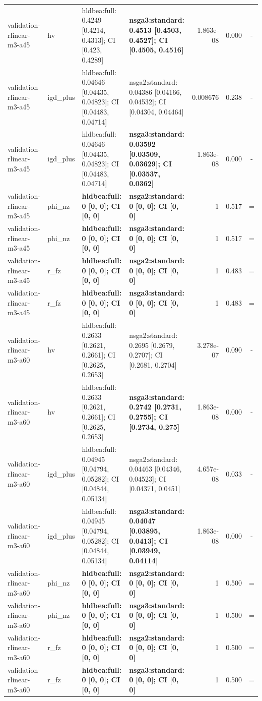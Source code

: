 \begin{tabular}{llllrrc}
validation-rlinear-m3-a45 & hv & hldbea:full: 0.4249 [0.4214, 0.4313]; CI [0.423, 0.4289] & \textbf{nsga3:standard: 0.4513 [0.4503, 0.4527]; CI [0.4505, 0.4516]} & 1.863e-08 & 0.000 & - \\
validation-rlinear-m3-a45 & igd\_plus & hldbea:full: 0.04646 [0.04435, 0.04823]; CI [0.04483, 0.04714] & nsga2:standard: 0.04386 [0.04166, 0.04532]; CI [0.04304, 0.04464] & 0.008676 & 0.238 & - \\
validation-rlinear-m3-a45 & igd\_plus & hldbea:full: 0.04646 [0.04435, 0.04823]; CI [0.04483, 0.04714] & \textbf{nsga3:standard: 0.03592 [0.03509, 0.03629]; CI [0.03537, 0.0362]} & 1.863e-08 & 0.000 & - \\
validation-rlinear-m3-a45 & phi\_nz & \textbf{hldbea:full: 0 [0, 0]; CI [0, 0]} & \textbf{nsga2:standard: 0 [0, 0]; CI [0, 0]} & 1 & 0.517 & = \\
validation-rlinear-m3-a45 & phi\_nz & \textbf{hldbea:full: 0 [0, 0]; CI [0, 0]} & \textbf{nsga3:standard: 0 [0, 0]; CI [0, 0]} & 1 & 0.517 & = \\
validation-rlinear-m3-a45 & r\_fz & \textbf{hldbea:full: 0 [0, 0]; CI [0, 0]} & \textbf{nsga2:standard: 0 [0, 0]; CI [0, 0]} & 1 & 0.483 & = \\
validation-rlinear-m3-a45 & r\_fz & \textbf{hldbea:full: 0 [0, 0]; CI [0, 0]} & \textbf{nsga3:standard: 0 [0, 0]; CI [0, 0]} & 1 & 0.483 & = \\
validation-rlinear-m3-a60 & hv & hldbea:full: 0.2633 [0.2621, 0.2661]; CI [0.2625, 0.2653] & nsga2:standard: 0.2695 [0.2679, 0.2707]; CI [0.2681, 0.2704] & 3.278e-07 & 0.090 & - \\
validation-rlinear-m3-a60 & hv & hldbea:full: 0.2633 [0.2621, 0.2661]; CI [0.2625, 0.2653] & \textbf{nsga3:standard: 0.2742 [0.2731, 0.2755]; CI [0.2734, 0.275]} & 1.863e-08 & 0.000 & - \\
validation-rlinear-m3-a60 & igd\_plus & hldbea:full: 0.04945 [0.04794, 0.05282]; CI [0.04844, 0.05134] & nsga2:standard: 0.04463 [0.04346, 0.04523]; CI [0.04371, 0.0451] & 4.657e-08 & 0.033 & - \\
validation-rlinear-m3-a60 & igd\_plus & hldbea:full: 0.04945 [0.04794, 0.05282]; CI [0.04844, 0.05134] & \textbf{nsga3:standard: 0.04047 [0.03895, 0.0413]; CI [0.03949, 0.04114]} & 1.863e-08 & 0.000 & - \\
validation-rlinear-m3-a60 & phi\_nz & \textbf{hldbea:full: 0 [0, 0]; CI [0, 0]} & \textbf{nsga2:standard: 0 [0, 0]; CI [0, 0]} & 1 & 0.500 & = \\
validation-rlinear-m3-a60 & phi\_nz & \textbf{hldbea:full: 0 [0, 0]; CI [0, 0]} & \textbf{nsga3:standard: 0 [0, 0]; CI [0, 0]} & 1 & 0.500 & = \\
validation-rlinear-m3-a60 & r\_fz & \textbf{hldbea:full: 0 [0, 0]; CI [0, 0]} & \textbf{nsga2:standard: 0 [0, 0]; CI [0, 0]} & 1 & 0.500 & = \\
validation-rlinear-m3-a60 & r\_fz & \textbf{hldbea:full: 0 [0, 0]; CI [0, 0]} & \textbf{nsga3:standard: 0 [0, 0]; CI [0, 0]} & 1 & 0.500 & = \\
\bottomrule
\end{tabular}
